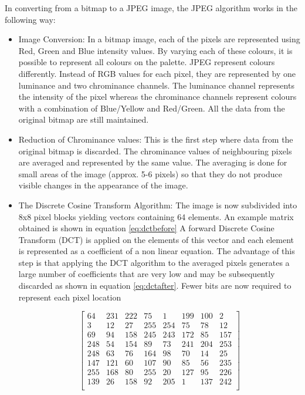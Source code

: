 In converting from a bitmap to a JPEG image, the JPEG algorithm works \cite{jstegjpeg} in the following way:
\begin{itemize}
\item{Image Conversion}: In a bitmap image, each of the pixels are represented using Red, Green and Blue intensity values. By varying each of these colours, it is possible to represent all colours on the palette. JPEG represent colours differently. Instead of RGB values for each pixel, they are represented by one luminance and two chrominance channels. The luminance channel represents the intensity of the pixel whereas the chrominance channels represent colours with a combination of Blue/Yellow and Red/Green. All the data from the original bitmap are still maintained.
\item{Reduction of Chrominance values}: This is the first step where data from the original bitmap is discarded. The chrominance values of neighbouring pixels are averaged and represented by the same value. The averaging is done for small areas of the image (approx. 5-6 pixels) so that they do not produce visible changes in the appearance of the image.
\item{The Discrete Cosine Transform Algorithm}: The image is now subdivided into 8x8 pixel blocks yielding vectors containing 64 elements. An example matrix obtained is shown in equation \ref{eq:dctbefore} A forward Discrete Cosine Transform (DCT) is applied on the elements of this vector and each element is represented as a coefficient of a non linear equation. The advantage of this step is that applying the DCT algorithm to the averaged pixels generates a large number of coefficients that are very low and may be subsequently discarded as shown in equation \ref{eq:dctafter}. Fewer bits are now required to represent each pixel location


\begin{equation}
\label{eq:dctbefore}
\begin{bmatrix} 
64 & 231 & 222 & 75 & 1 & 199 & 100 & 2 \\
3 & 12 & 27 & 255 & 254 & 75 & 78 & 12 \\
69 & 94 & 158 & 245 & 243 & 172 & 85 & 157 \\ 
248 & 54 & 154 & 89 & 73 & 241 & 204 & 253 \\
248 & 63 & 76 & 164 & 98 & 70 & 14 & 25 \\
147 & 121 & 60 & 107 & 90 & 85 & 56 & 235 \\
255 & 168 & 80 & 255 & 20 & 127 & 95 & 226 \\
139 & 26 & 158 & 92 & 205 & 1 & 137 & 242 \\
\end{bmatrix}
\end{equation}


\end{itemize}
